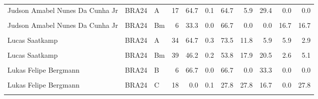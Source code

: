 \documentclass[
]{book}
\begin{document}
\begin{table}[!h]
{\begin{tabular}[t]{lllrrrrrrrr}
Judson Amabel Nunes Da Cunha Jr & BRA24 & A & 17 & 64.7 & 0.1 & 64.7 & 5.9 & 29.4 & 0.0 & 0.0\\
\cellcolor{gray!10}{Judson Amabel Nunes Da Cunha Jr} & \cellcolor{gray!10}{BRA24} & \cellcolor{gray!10}{B} & \cellcolor{gray!10}{12} & \cellcolor{gray!10}{16.7} & \cellcolor{gray!10}{0.0} & \cellcolor{gray!10}{33.3} & \cellcolor{gray!10}{16.7} & \cellcolor{gray!10}{33.3} & \cellcolor{gray!10}{8.3} & \cellcolor{gray!10}{8.3}\\
\addlinespace
Judson Amabel Nunes Da Cunha Jr & BRA24 & Bm & 6 & 33.3 & 0.0 & 66.7 & 0.0 & 0.0 & 16.7 & 16.7\\
\cellcolor{gray!10}{Judson Amabel Nunes Da Cunha Jr} & \cellcolor{gray!10}{BRA24} & \cellcolor{gray!10}{C} & \cellcolor{gray!10}{1} & \cellcolor{gray!10}{100.0} & \cellcolor{gray!10}{0.0} & \cellcolor{gray!10}{100.0} & \cellcolor{gray!10}{0.0} & \cellcolor{gray!10}{0.0} & \cellcolor{gray!10}{0.0} & \cellcolor{gray!10}{0.0}\\
Lucas Saatkamp & BRA24 & A & 34 & 64.7 & 0.3 & 73.5 & 11.8 & 5.9 & 5.9 & 2.9\\
\cellcolor{gray!10}{Lucas Saatkamp} & \cellcolor{gray!10}{BRA24} & \cellcolor{gray!10}{B} & \cellcolor{gray!10}{53} & \cellcolor{gray!10}{49.1} & \cellcolor{gray!10}{0.3} & \cellcolor{gray!10}{62.3} & \cellcolor{gray!10}{15.1} & \cellcolor{gray!10}{9.4} & \cellcolor{gray!10}{7.5} & \cellcolor{gray!10}{5.7}\\
Lucas Saatkamp & BRA24 & Bm & 39 & 46.2 & 0.2 & 53.8 & 17.9 & 20.5 & 2.6 & 5.1\\
\addlinespace
\cellcolor{gray!10}{Lukas Felipe Bergmann} & \cellcolor{gray!10}{BRA24} & \cellcolor{gray!10}{A} & \cellcolor{gray!10}{7} & \cellcolor{gray!10}{14.3} & \cellcolor{gray!10}{0.0} & \cellcolor{gray!10}{42.9} & \cellcolor{gray!10}{0.0} & \cellcolor{gray!10}{28.6} & \cellcolor{gray!10}{0.0} & \cellcolor{gray!10}{28.6}\\
Lukas Felipe Bergmann & BRA24 & B & 6 & 66.7 & 0.0 & 66.7 & 0.0 & 33.3 & 0.0 & 0.0\\
\cellcolor{gray!10}{Lukas Felipe Bergmann} & \cellcolor{gray!10}{BRA24} & \cellcolor{gray!10}{Bm} & \cellcolor{gray!10}{16} & \cellcolor{gray!10}{56.2} & \cellcolor{gray!10}{0.1} & \cellcolor{gray!10}{62.5} & \cellcolor{gray!10}{18.8} & \cellcolor{gray!10}{12.5} & \cellcolor{gray!10}{0.0} & \cellcolor{gray!10}{6.2}\\
Lukas Felipe Bergmann & BRA24 & C & 18 & 0.0 & 0.1 & 27.8 & 27.8 & 16.7 & 0.0 & 27.8\\
\cellcolor{gray!10}{Mauricio Borges Silva} & \cellcolor{gray!10}{BRA24} & \cellcolor{gray!10}{A} & \cellcolor{gray!10}{10} & \cellcolor{gray!10}{10.0} & \cellcolor{gray!10}{0.0} & \cellcolor{gray!10}{30.0} & \cellcolor{gray!10}{30.0} & \cellcolor{gray!10}{20.0} & \cellcolor{gray!10}{0.0} & \cellcolor{gray!10}{20.0}\\

\end{tabular}}
\end{table}
\end{document}
